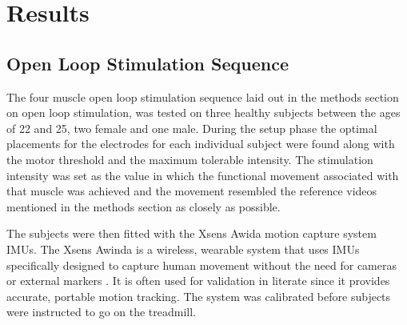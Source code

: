 




\section{Results}

\subsection{Open Loop Stimulation Sequence}
The four muscle open loop stimulation sequence laid out in the methods section on open loop stimulation, was tested on three healthy subjects between the ages of 22 and 25, two female and one male. During the setup phase the optimal placements for the electrodes for each individual subject were found along with the motor threshold and the maximum tolerable intensity. The stimulation intensity was set as the value in which the functional movement associated with that muscle was achieved and the movement resembled the reference videos mentioned in the methods section as closely as possible.

The subjects were then fitted with the Xsens Awida  motion capture system IMUs. The Xsens Awinda is a wireless, wearable system that uses IMUs specifically designed to capture human movement without the need for cameras or external markers \cite{noauthor_mvn_nodate}. It is often used for validation in literate since it provides accurate, portable motion tracking. The system was calibrated before subjects were instructed to go on the treadmill. 

